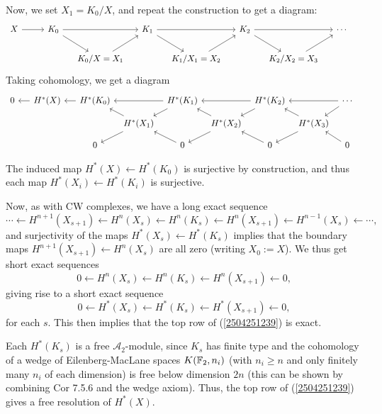 \documentclass[11pt, titlepage]{article} %
\def\bb{\ensuremath\mathbb}
\def\A{\ensuremath{\mathscr{A}_2}}
\numberwithin{equation}{subsection}
\theoremstyle{plain}
\theoremstyle{definition}
\begin{document}
Now, we set \(X_1=K_0/X\), and repeat the construction to get a diagram:
\begin{equation}\label{2503301114}
\begin{tikzcd}[column sep=3ex] 
 X \arrow[rr, ""]  & & K_0 \arrow[rr, ""] \arrow[dr, ""] & & K_1 \arrow[dr, ""] \arrow[rr, ""] & & K_2 \arrow[dr, ""] \arrow[rr, ""] & & \cdots \\ 
  &&& K_0/X=X_1 \arrow[ur, ""] & & K_1/X_1=X_2 \arrow[ur, ""] & & K_2/X_2=X_3 \arrow[ur, ""] &  &
 \end{tikzcd}\nonumber
\end{equation}
Taking cohomology, we get a diagram
\begin{equation}\label{2504251239}
\begin{tikzcd}[column sep=1.5ex, row sep = 2ex, arrows=<-]
 0 \arrow[rr, ""] && H^*(X) \arrow[rr,""] & & H^*(K_0) \arrow[rr, ""] \arrow[dr, ""] & & H^*(K_1) \arrow[dr, ""] \arrow[rr, ""] & & H^*(K_2) \arrow[dr, ""] \arrow[rr, ""] & & \cdots \\ 
  &&&&& H^*(X_1) \arrow[ur, ""] \arrow[dr] & & H^*(X_2) \arrow[ur, ""] \arrow[dr] & & H^*(X_3) \arrow[ur, ""] \arrow[dr] &  &\\
&&&& 0 \arrow[ur] && 0 \arrow[ur] && 0 \arrow[ur] && 0
 \end{tikzcd}
\end{equation}

The induced map \(H^*(X)\leftarrow H^*(K_0)\) is surjective by construction, and thus each map \(H^*(X_i)\leftarrow H^*(K_i)\) is surjective. 

Now, as with CW complexes, we have a long exact sequence
\[\cdots \leftarrow H^{n+1}(X_{s+1})\leftarrow H^n(X_{s})\leftarrow H^n(K_s)\leftarrow H^n(X_{s+1})\leftarrow H^{n-1}(X_s)\leftarrow \cdots,\]
and surjectivity of the maps \(H^*(X_s)\leftarrow H^*(K_s)\) implies that the boundary maps \(H^{n+1}(X_{s+1})\leftarrow H^n(X_s)\) are all zero (writing \(X_0:=X\)). We thus get short exact sequences
\[0\leftarrow H^n(X_{s})\leftarrow H^n(K_s)\leftarrow H^n(X_{s+1})\leftarrow0,\]
giving rise to a short exact sequence
\[0\leftarrow H^*(X_{s})\leftarrow H^*(K_s)\leftarrow H^*(X_{s+1})\leftarrow0,\]
for each \(s\). This then implies that the top row of (\ref{2504251239}) is exact.

Each \(H^*(K_s)\) is a free \(\A\)-module, since \(K_s\) has finite type and the cohomology of a wedge of Eilenberg-MacLane spaces \(K(\bb{F}_2, n_i)\) (with \(n_i \geq n\) and only finitely many \(n_i\) of each dimension) is free below dimension \(2n\) (this can be shown by combining \autocite{rognes2} Cor 7.5.6 and the wedge axiom). Thus, the top row of (\ref{2504251239}) gives a free resolution of \(H^*(X)\). 
\end{document}
